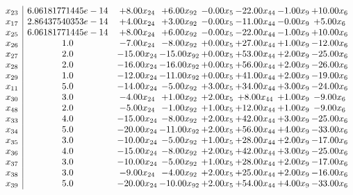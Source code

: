 \documentclass[8pt]{article}
\begin{document}
\[\begin{array}{c| c c@{\hskip 2pt} c@{\hskip 2pt} c@{\hskip 2pt} c@{\hskip 2pt} c@{\hskip 2pt} c@{\hskip 2pt} }
 x_{23}   &  6.06181771445e-14 & +  8.00 x_{24} & +  6.00 x_{92} & -0.00 x_{5} & -22.00 x_{44} & -1.00 x_{9} & + 10.00 x_{6}\\
 x_{17}   &  2.86437540353e-14 & +  4.00 x_{24} & +  3.00 x_{92} & -0.00 x_{5} & -11.00 x_{44} & -0.00 x_{9} & +  5.00 x_{6}\\
 x_{25}   &  6.06181771445e-14 & +  8.00 x_{24} & +  6.00 x_{92} & -0.00 x_{5} & -22.00 x_{44} & -1.00 x_{9} & + 10.00 x_{6}\\
 x_{26}   &  1.0 & -7.00 x_{24} & -8.00 x_{92} & +  0.00 x_{5} & + 27.00 x_{44} & +  1.00 x_{9} & -12.00 x_{6}\\
 x_{27}   &  2.0 & -15.00 x_{24} & -15.00 x_{92} & +  0.00 x_{5} & + 53.00 x_{44} & +  2.00 x_{9} & -25.00 x_{6}\\
 x_{28}   &  2.0 & -16.00 x_{24} & -16.00 x_{92} & +  0.00 x_{5} & + 56.00 x_{44} & +  2.00 x_{9} & -26.00 x_{6}\\
 x_{29}   &  1.0 & -12.00 x_{24} & -11.00 x_{92} & +  0.00 x_{5} & + 41.00 x_{44} & +  2.00 x_{9} & -19.00 x_{6}\\
 x_{11}   &  5.0 & -14.00 x_{24} & -5.00 x_{92} & +  3.00 x_{5} & + 34.00 x_{44} & +  3.00 x_{9} & -24.00 x_{6}\\
 x_{30}   &  3.0 & -4.00 x_{24} & +  1.00 x_{92} & +  2.00 x_{5} & +  8.00 x_{44} & +  1.00 x_{9} & -9.00 x_{6}\\
 x_{48}   &  2.0 & -5.00 x_{24} & -1.00 x_{92} & +  1.00 x_{5} & + 12.00 x_{44} & +  1.00 x_{9} & -9.00 x_{6}\\
 x_{33}   &  4.0 & -15.00 x_{24} & -8.00 x_{92} & +  2.00 x_{5} & + 42.00 x_{44} & +  3.00 x_{9} & -25.00 x_{6}\\
 x_{34}   &  5.0 & -20.00 x_{24} & -11.00 x_{92} & +  2.00 x_{5} & + 56.00 x_{44} & +  4.00 x_{9} & -33.00 x_{6}\\
 x_{35}   &  3.0 & -10.00 x_{24} & -5.00 x_{92} & +  1.00 x_{5} & + 28.00 x_{44} & +  2.00 x_{9} & -17.00 x_{6}\\
 x_{36}   &  4.0 & -15.00 x_{24} & -8.00 x_{92} & +  2.00 x_{5} & + 42.00 x_{44} & +  3.00 x_{9} & -25.00 x_{6}\\
 x_{37}   &  3.0 & -10.00 x_{24} & -5.00 x_{92} & +  1.00 x_{5} & + 28.00 x_{44} & +  2.00 x_{9} & -17.00 x_{6}\\
 x_{38}   &  3.0 & -9.00 x_{24} & -4.00 x_{92} & +  2.00 x_{5} & + 25.00 x_{44} & +  2.00 x_{9} & -16.00 x_{6}\\
 x_{39}   &  5.0 & -20.00 x_{24} & -10.00 x_{92} & +  2.00 x_{5} & + 54.00 x_{44} & +  4.00 x_{9} & -33.00 x_{6}\\

\end{array}\]
\end{document}
